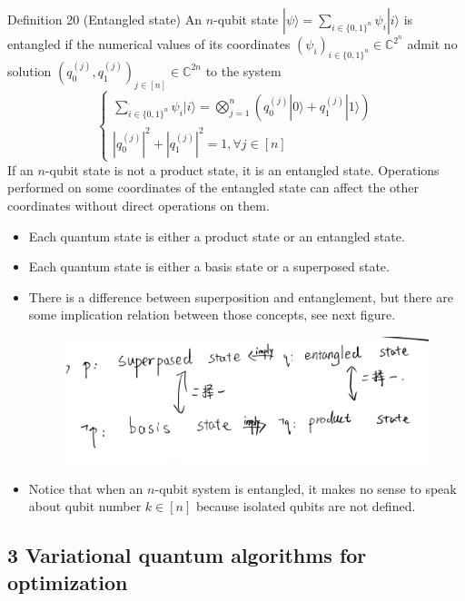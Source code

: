 Definition 20 (Entangled state) An $n$-qubit state $|\psi\rangle=\sum_{i \in\{0,1\}^{n}} \psi_{i}|i\rangle$ is entangled if the numerical values of its coordinates $\left(\psi_{i}\right)_{i \in\{0,1\}^{n}} \in \mathbb{C}^{2^{n}}$ admit no solution $\left(q_{0}^{(j)}, q_{1}^{(j)}\right)_{j \in[n]} \in \mathbb{C}^{2 n}$ to the system
$$
\left\{\begin{array}{l}
\sum_{i \in\{0,1\}^{n}} \psi_{i}|i\rangle=\bigotimes_{j=1}^{n}\left(q_{0}^{(j)}|0\rangle+q_{1}^{(j)}|1\rangle\right) \\
\left|q_{0}^{(j)}\right|^{2}+\left|q_{1}^{(j)}\right|^{2}=1, \forall j \in [n]
\end{array}\right.
$$
If an $n$-qubit state is not a product state, it is an entangled state. Operations performed on some coordinates of the entangled state can affect the other coordinates without direct operations on them.

\begin{remark}
    \begin{itemize}
        \item Each quantum state is either a product state or an entangled state.
        \item Each quantum state is either a basis state or a superposed state.
        \item There is a difference between superposition and entanglement, but there are some implication relation between those concepts, see next figure. %
\begin{figure}
    \centering
    \includegraphics[width=0.75\linewidth]{relation-superposed-entangled.jpg}
\end{figure}
        \item Notice that when an $n$-qubit system is entangled, it makes no sense to speak about qubit number $k \in[n]$ because isolated qubits are not defined. 
    \end{itemize}
\end{remark}

\subsection{3 Variational quantum algorithms for optimization}

